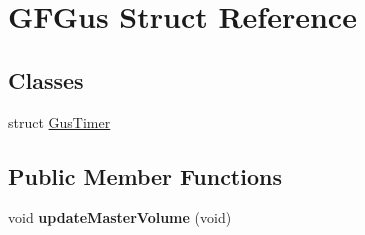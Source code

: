 \hypertarget{structGFGus}{\section{G\-F\-Gus Struct Reference}
\label{structGFGus}
}
\subsection*{Classes}
\begin{DoxyCompactItemize}
\item 
struct \hyperlink{structGFGus_1_1GusTimer}{Gus\-Timer}
\end{DoxyCompactItemize}
\subsection*{Public Member Functions}
\begin{DoxyCompactItemize}
\item 
\hypertarget{structGFGus_a8c401e71f379d4785a906e5388f4042f}{void {\bfseries update\-Master\-Volume} (void)}\label{structGFGus_a8c401e71f379d4785a906e5388f4042f}

\end{DoxyCompactItemize}
